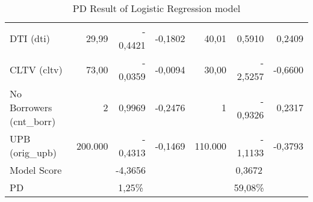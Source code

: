 \begin{table}[H]
\begin{tabular}{l|rrr|rrr}
\multicolumn{1}{l|}{DTI (dti)}               & 29,99                                                                                 & -           0,4421                                                                  & \multicolumn{1}{r|}{-0,1802}        & 40,01                                                                                 & 0,5910                                                                              & 0,2409                             \\
\multicolumn{1}{l|}{CLTV (cltv)}              & 73,00                                                                                 & -           0,0359                                                                  & \multicolumn{1}{r|}{-0,0094}        & 30,00                                                                                 & -           2,5257                                                                  & -0,6600                            \\
\multicolumn{1}{l|}{No Borrowers (cnt\_borr)}      & 2                                                                                     & 0,9969                                                                              & \multicolumn{1}{r|}{-0,2476}        & 1                                                                                     & -           0,9326                                                                  & 0,2317                             \\
\multicolumn{1}{l|}{UPB (orig\_upb)}               & 200.000                                                                               & -           0,4313                                                                  & \multicolumn{1}{r|}{-0,1469}        & 110.000                                                                               & -           1,1133                                                                  & -0,3793                            \\
\multicolumn{1}{l|}{Model Score}       & \multicolumn{3}{c|}{-4,3656}                                                                                                                                                                                      & \multicolumn{3}{c}{0,3672}                                                                                                                                                                                       \\
\multicolumn{1}{l|}{PD}                & \multicolumn{3}{c|}{1,25\%}                                                                                                                                                                                       & \multicolumn{3}{c}{59,08\%} \\\bottomrule                                                                                                                                                                                     
\end{tabular}
\caption{PD Result of Logistic Regression model}
\label{tab:re_PDres}
\end{table}

